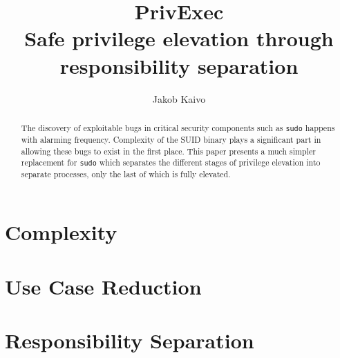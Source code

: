 \documentclass{article}
\title{%
    PrivExec\\
    \large Safe privilege elevation through responsibility separation
}
\author{Jakob Kaivo}
\begin{document}
\maketitle

\begin{abstract}
The discovery of exploitable bugs in critical security components such as
\texttt{sudo} happens with alarming frequency. Complexity of the SUID binary
plays a significant part in allowing these bugs to exist in the first place.
This paper presents a much simpler replacement for \texttt{sudo} which
separates the different stages of privilege elevation into separate processes,
only the last of which is fully elevated.
\end{abstract}

\section{Complexity}

\section{Use Case Reduction}

\section{Responsibility Separation}
\end{document}
